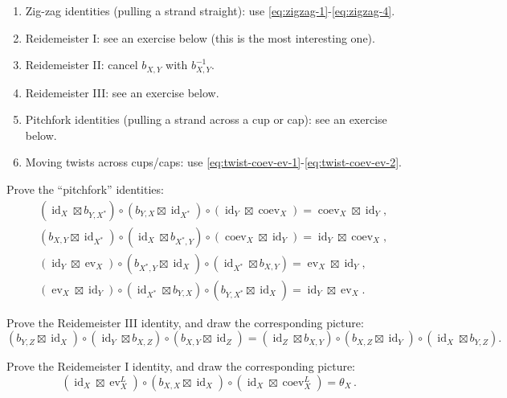 \documentclass[12pt,letterpaper,reqno]{amsart}
\numberwithin{equation}{section}
\DeclareMathOperator{\id}{id}
\DeclareMathOperator{\ev}{ev}
\DeclareMathOperator{\coev}{coev}
\DeclareRobustCommand{\fixme}[1]{\leavevmode{\color{orange}[#1]}}
\begin{document}
\begin{enumerate}
\item Zig-zag identities (pulling a strand straight): use \eqref{eq:zigzag-1}-\eqref{eq:zigzag-4}.
\item Reidemeister I: see an exercise below (this is the most interesting one).
\item Reidemeister II: cancel $b_{X,Y}$ with $b^{-1}_{X,Y}$.
\item Reidemeister III: see an exercise below.
\item Pitchfork identities (pulling a strand across a cup or cap): see an exercise below.
\item Moving twists across cups/caps: use \eqref{eq:twist-coev-ev-1}-\eqref{eq:twist-coev-ev-2}.
\end{enumerate}

\begin{exercise}
Prove the ``pitchfork'' identities:
\begin{align*}
&(\id_X\boxtimes b_{Y,X^*})\circ(b_{Y,X}\boxtimes \id_{X^*})\circ(\id_Y\boxtimes \coev_X)
=\coev_X\boxtimes \id_Y,\\
&(b_{X,Y}\boxtimes \id_{X^*})\circ(\id_X\boxtimes b_{X^*,Y})\circ(\coev_X\boxtimes \id_Y)
=\id_Y\boxtimes \coev_X,\\
&(\id_Y\boxtimes \ev_X)\circ(b_{X^*,Y}\boxtimes \id_X)\circ(\id_{X^*}\boxtimes b_{X,Y})
=\ev_X\boxtimes \id_Y,\\
&(\ev_X\boxtimes \id_Y)\circ(\id_{X^*}\boxtimes b_{Y,X})\circ(b_{Y,X^*}\boxtimes \id_X)
=\id_Y\boxtimes \ev_X.
\end{align*}
\end{exercise}



\begin{exercise}

Prove the Reidemeister III identity, and draw the corresponding picture:
\[
(b_{Y,Z}\boxtimes \id_X)\circ(\id_Y\boxtimes b_{X,Z})\circ(b_{X,Y}\boxtimes \id_Z)
=
(\id_Z\boxtimes b_{X,Y})\circ(b_{X,Z}\boxtimes \id_Y)\circ(\id_X\boxtimes b_{Y,Z}).
\]

\end{exercise}


\begin{exercise}

Prove the Reidemeister I identity, and draw the corresponding picture: \fixme{check sign}
\begin{equation}
  (\id_X \boxtimes \ev^L_X) \circ (b_{X,X} \boxtimes \id_X) \circ (\id_X \boxtimes \coev_X^L) = \theta_X \, .
\end{equation}

\end{exercise}
\end{document}
